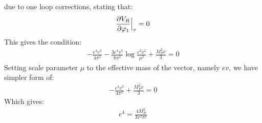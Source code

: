 due to one loop corrections, stating that:
\begin{align}
\frac{\partial V_R}{\partial \varphi_1} \Big|_v= 0
\end{align}
This gives the condition:
\begin{align}
-\frac{e^4v^3}{4\pi^2}-\frac{3e^4v^3}{8\pi^2}\log\frac{e^2v^2}{\mu^2}+\frac{M_P^2v}{3}=0
\end{align}
Setting scale parameter $\mu$ to the effective mass of the vector, namely $ev$, we have 
simpler form of:
\begin{align}
-\frac{e^4v^3}{4\pi^2}+\frac{M_P^2v}{3}=0
\end{align}
Which gives:
\begin{align}
e^4 = \frac{4M_P^2}{3v^2\pi^2}
\end{align}




